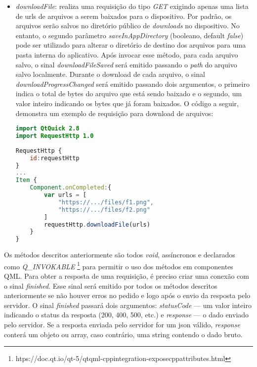 \begin{itemize}
	\item \textit{downloadFile}: realiza uma requisição do tipo \textit{GET} exigindo apenas uma lista de urls de arquivos a serem baixados para o dispositivo. Por padrão, os arquivos serão salvos no diretório público de \textit{downloads} no dispositivo. No entanto, o segundo parâmetro \textit{saveInAppDirectory} (booleano, default \textit{false}) pode ser utilizado para alterar o diretório de destino dos arquivos para uma pasta interna do aplicativo. Após invocar esse método, para cada arquivo salvo, o sinal \textit{downloadFileSaved} será emitido passando o \textit{path} do arquivo salvo localmente. Durante o download de cada arquivo, o sinal \textit{downloadProgressChanged} será emitido passando dois argumentos, o primeiro indica o total de bytes do arquivo que está sendo baixado e o segundo, um valor inteiro indicando os bytes que já foram baixados. O código a seguir, demonstra um exemplo de requisição para download de arquivos:
\begin{center}
\begin{lstlisting}[language=qml]
import QtQuick 2.8
import RequestHttp 1.0
	
RequestHttp {
	id:requestHttp
}
...
Item {
	Component.onCompleted:{
		var urls = [
			"https://.../files/f1.png",
			"https://.../files/f2.png"
		]
		requestHttp.downloadFile(urls)
	}
}
\end{lstlisting}
\end{center}

\end{itemize}

Os métodos descritos anteriormente são todos \textit{void}, assíncronos e declarados como \textit{Q\_INVOKABLE} \footnote{htps://doc.qt.io/qt-5/qtqml-cppintegration-exposecppattributes.html} para permitir o uso dos métodos em componentes QML. Para obter a resposta de uma requisição, é preciso criar uma conexão com o sinal \textit{finished}. Esse sinal será emitido por todos os métodos descritos anteriormente se não houver erros no pedido e logo após o envio da resposta pelo servidor. O sinal \textit{finished} passará dois argumentos: \textit{statusCode} — um valor inteiro indicando o status da resposta (200, 400, 500, etc.) e \textit{response} — o dado enviado pelo servidor. Se a resposta enviada pelo servidor for um json válido, \textit{response} conterá um objeto ou array, caso contrário, uma string contendo o dado bruto.\par

